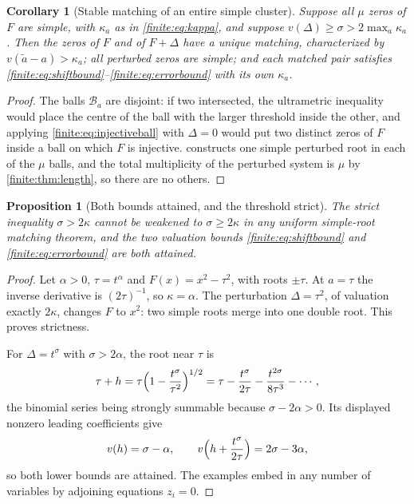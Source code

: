 \documentclass[11pt,letterpaper]{article}
\newtheorem{proposition}[theorem]{Proposition}
\newtheorem{corollary}[theorem]{Corollary}
\theoremstyle{definition}
\theoremstyle{remark}
\numberwithin{equation}{section}
\begin{document}
\begin{corollary}[Stable matching of an entire simple cluster]
\label{finite:cor:matching}
Suppose all $\mu$ zeros of $F$ are simple, with $\kappa_a$ as in \eqref{finite:eq:kappa}, and suppose $v(\Delta)\geq\sigma>2\max_a\kappa_a$. Then the zeros of $F$ and of $F+\Delta$ have a unique matching, characterized by $v(\widetilde a-a)>\kappa_a$; all perturbed zeros are simple; and each matched pair satisfies \eqref{finite:eq:shiftbound}--\eqref{finite:eq:errorbound} with its own $\kappa_a$.
\end{corollary}

\begin{proof}
The balls $\mathcal B_a$ are disjoint: if two intersected, the ultrametric inequality would place the centre of the ball with the larger threshold inside the other, and applying \eqref{finite:eq:injectiveball} with $\Delta=0$ would put two distinct zeros of $F$ inside a ball on which $F$ is injective.  constructs one simple perturbed root in each of the $\mu$ balls, and the total multiplicity of the perturbed system is $\mu$ by \cref{finite:thm:length}, so there are no others.
\end{proof}

\begin{proposition}[Both bounds attained, and the threshold strict]
\label{finite:prop:sharpness}
The strict inequality $\sigma>2\kappa$ cannot be weakened to $\sigma\geq2\kappa$ in any uniform simple-root matching theorem, and the two valuation bounds \eqref{finite:eq:shiftbound} and \eqref{finite:eq:errorbound} are both attained.
\end{proposition}

\begin{proof}
Let $\alpha>0$, $\tau=t^\alpha$ and $F(x)=x^2-\tau^2$, with roots $\pm\tau$. At $a=\tau$ the inverse derivative is $(2\tau)^{-1}$, so $\kappa=\alpha$. The perturbation $\Delta=\tau^2$, of valuation exactly $2\kappa$, changes $F$ to $x^2$: two simple roots merge into one double root. This proves strictness.

For $\Delta=t^\sigma$ with $\sigma>2\alpha$, the root near $\tau$ is
\[
 \tau+h=\tau\Bigl(1-\frac{t^\sigma}{\tau^2}\Bigr)^{1/2}
 =\tau-\frac{t^\sigma}{2\tau}-\frac{t^{2\sigma}}{8\tau^3}-\cdots,
\]
the binomial series being strongly summable because $\sigma-2\alpha>0$. Its displayed nonzero leading coefficients give
\[
 v(h)=\sigma-\alpha,
 \qquad
 v\Bigl(h+\frac{t^\sigma}{2\tau}\Bigr)=2\sigma-3\alpha,
\]
so both lower bounds are attained. The examples embed in any number of variables by adjoining equations $z_i=0$.
\end{proof}
\end{document}
